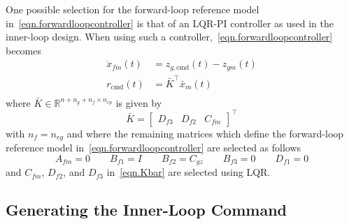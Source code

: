 \begin{rem-dan}
  One possible selection for the forward-loop reference model in\ \eqref{eqn.forwardloopcontroller} is that of an LQR-PI controller as used in the inner-loop design.
  When using such a controller,\ \eqref{eqn.forwardloopcontroller} becomes
  \begin{equation}
    \label{eqn.rKbar}
    \begin{split}
      \dot{x}_{fm}(t) &= z_{g,\text{cmd}}(t) - z_{gm}(t) \\
      r_{\text{cmd}}(t) &= \bar{K}^{\top}\bar{x}_{m}(t) \\
    \end{split}
  \end{equation}
  where $\bar{K}\in\mathbb{R}^{n+n_{g}+n_{f} \times n_{ep}}$ is given by
  \begin{equation}
    \label{eqn.Kbar}
    \bar{K} =
    \begin{bmatrix}
      D_{f3} & D_{f2} & C_{fm}
    \end{bmatrix}^{\top}
  \end{equation}
  with $n_{f} = n_{eg}$ and where the remaining matrices which define the forward-loop reference model in\ \eqref{eqn.forwardloopcontroller} are selected as follows
  \begin{equation}
    A_{fm} = 0
    \qquad
    B_{f1} = I
    \qquad
    B_{f2} = C_{gz}
    \qquad
    B_{f3} = 0
    \qquad
    D_{f1} = 0
  \end{equation}
  and $C_{fm}$, $D_{f2}$, and $D_{f3}$ in\ \eqref{eqn.Kbar} are selected using LQR.\@
\end{rem-dan}

\subsection{Generating the Inner-Loop Command}

